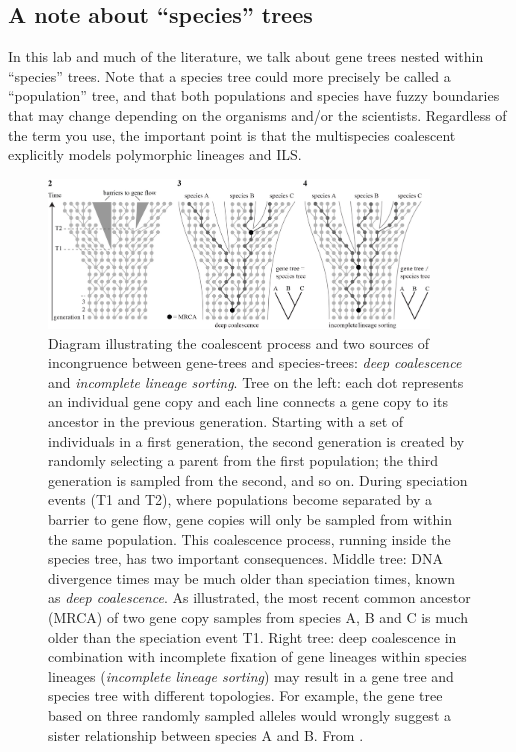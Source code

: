 \documentclass[11pt]{article}
\begin{document}
\subsection{A note about ``species'' trees}

In this lab and much of the literature, we talk about gene trees nested within ``species'' trees.
Note that a species tree could more precisely be called a ``population'' tree,
and that both populations and species have fuzzy boundaries that may change depending on the
organisms and/or the scientists.
Regardless of the term you use, the important point is that the
multispecies coalescent explicitly models polymorphic lineages and ILS.

\begin{figure}
\centering
\includegraphics[width=0.9\textwidth]{ils.jpg}
\caption{
    Diagram illustrating the coalescent process and two sources of incongruence between gene-trees and species-trees:
    \textit{deep coalescence} and \textit{incomplete lineage sorting}. 
    Tree on the left: each dot represents an individual gene copy and each line connects a gene copy to its
    ancestor in the previous generation. Starting with a set of individuals in a first generation, the second generation is created by
    randomly selecting a parent from the first population; the third generation is sampled from the second, and so on. During speciation
    events (T1 and T2), where populations become separated by a barrier to gene flow, gene copies will only be sampled from within the
    same population. This coalescence process, running inside the species tree, has two important consequences. Middle tree:
    DNA divergence times may be much older than speciation times, known as \textit{deep coalescence}. As illustrated, the most recent
    common ancestor (MRCA) of two gene copy samples from species A, B and C is much older than the speciation event T1. Right tree:
    deep coalescence in combination with incomplete fixation of gene lineages within species lineages (\textit{incomplete lineage sorting}) may
    result in a gene tree and species tree with different topologies. For example, the gene tree based on three randomly sampled alleles
    would wrongly suggest a sister relationship between species A and B.
From \protect\citet{leliaert2014dna}.}
\end{figure}
\end{document}
